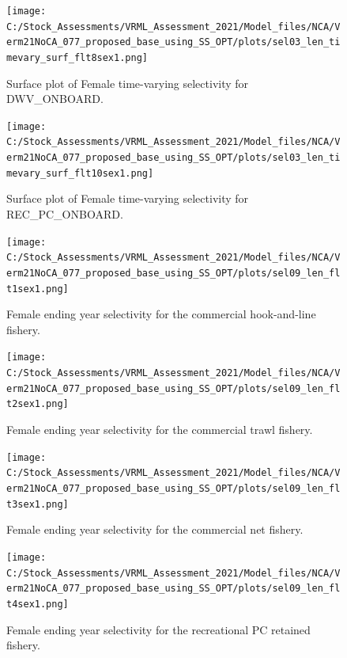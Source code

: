 \documentclass[11pt,
  english,
  a4paper,
]{article}
\begin{document}
\begin{figure}
\centering
\texttt{[image: C:/Stock\_Assessments/VRML\_Assessment\_2021/Model\_files/NCA/Verm21NoCA\_077\_proposed\_base\_using\_SS\_OPT/plots/sel03\_len\_timevary\_surf\_flt8sex1.png]}
\caption{Surface plot of Female time-varying selectivity for DWV\_ONBOARD.\label{fig:sel03_len_timevary_surf_flt8sex1}}
\end{figure}

\begin{figure}
\centering
\texttt{[image: C:/Stock\_Assessments/VRML\_Assessment\_2021/Model\_files/NCA/Verm21NoCA\_077\_proposed\_base\_using\_SS\_OPT/plots/sel03\_len\_timevary\_surf\_flt10sex1.png]}
\caption{Surface plot of Female time-varying selectivity for REC\_PC\_ONBOARD.\label{fig:sel03_len_timevary_surf_flt10sex1}}
\end{figure}

\FloatBarrier

\FloatBarrier

\begin{figure}
\centering
\texttt{[image: C:/Stock\_Assessments/VRML\_Assessment\_2021/Model\_files/NCA/Verm21NoCA\_077\_proposed\_base\_using\_SS\_OPT/plots/sel09\_len\_flt1sex1.png]}
\caption{Female ending year selectivity for the commercial hook-and-line fishery.\label{fig:endyr-selex-COM-HKL}}
\end{figure}

\begin{figure}
\centering
\texttt{[image: C:/Stock\_Assessments/VRML\_Assessment\_2021/Model\_files/NCA/Verm21NoCA\_077\_proposed\_base\_using\_SS\_OPT/plots/sel09\_len\_flt2sex1.png]}
\caption{Female ending year selectivity for the commercial trawl fishery.\label{fig:endyr-selex-COM-TWL}}
\end{figure}

\begin{figure}
\centering
\texttt{[image: C:/Stock\_Assessments/VRML\_Assessment\_2021/Model\_files/NCA/Verm21NoCA\_077\_proposed\_base\_using\_SS\_OPT/plots/sel09\_len\_flt3sex1.png]}
\caption{Female ending year selectivity for the commercial net fishery.\label{fig:endyr-selex-COM-NET}}
\end{figure}

\begin{figure}
\centering
\texttt{[image: C:/Stock\_Assessments/VRML\_Assessment\_2021/Model\_files/NCA/Verm21NoCA\_077\_proposed\_base\_using\_SS\_OPT/plots/sel09\_len\_flt4sex1.png]}
\caption{Female ending year selectivity for the recreational PC retained fishery.\label{fig:endyr-selex-REC-PC}}
\end{figure}
\end{document}
